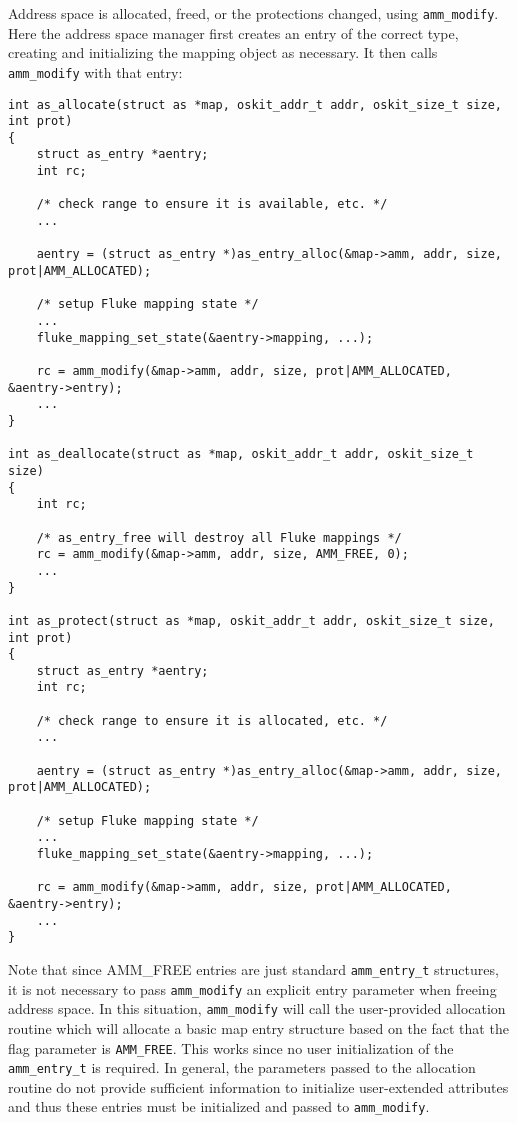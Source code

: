 Address space is allocated, freed, or the protections changed, using
{\tt amm_modify}.
Here the address space manager first creates an entry of the correct type,
creating and initializing the mapping object as necessary.
It then calls {\tt amm_modify} with that entry:
\begin{codefrag}
\footnotesize
\begin{verbatim}
int as_allocate(struct as *map, oskit_addr_t addr, oskit_size_t size, int prot)
{
    struct as_entry *aentry;
    int rc;

    /* check range to ensure it is available, etc. */
    ...

    aentry = (struct as_entry *)as_entry_alloc(&map->amm, addr, size, prot|AMM_ALLOCATED);

    /* setup Fluke mapping state */
    ...
    fluke_mapping_set_state(&aentry->mapping, ...);

    rc = amm_modify(&map->amm, addr, size, prot|AMM_ALLOCATED, &aentry->entry);
    ...
}

int as_deallocate(struct as *map, oskit_addr_t addr, oskit_size_t size)
{
    int rc;

    /* as_entry_free will destroy all Fluke mappings */
    rc = amm_modify(&map->amm, addr, size, AMM_FREE, 0);
    ...
}

int as_protect(struct as *map, oskit_addr_t addr, oskit_size_t size, int prot)
{
    struct as_entry *aentry;
    int rc;

    /* check range to ensure it is allocated, etc. */
    ...

    aentry = (struct as_entry *)as_entry_alloc(&map->amm, addr, size, prot|AMM_ALLOCATED);

    /* setup Fluke mapping state */
    ...
    fluke_mapping_set_state(&aentry->mapping, ...);

    rc = amm_modify(&map->amm, addr, size, prot|AMM_ALLOCATED, &aentry->entry);
    ...
}
\end{verbatim}
\end{codefrag}
Note that since AMM_FREE entries are just standard {\tt amm_entry_t} structures,
it is not necessary to pass {\tt amm_modify} an explicit entry parameter when
freeing address space.
In this situation,
{\tt amm_modify} will call the user-provided allocation routine which will
allocate a basic map entry structure based on the fact that the flag parameter
is {\tt AMM_FREE}.
This works since no user initialization of the {\tt amm_entry_t} is required.
In general,
the parameters passed to the allocation routine do not provide sufficient
information to initialize user-extended attributes and thus these entries
must be initialized and passed to {\tt amm_modify}.

